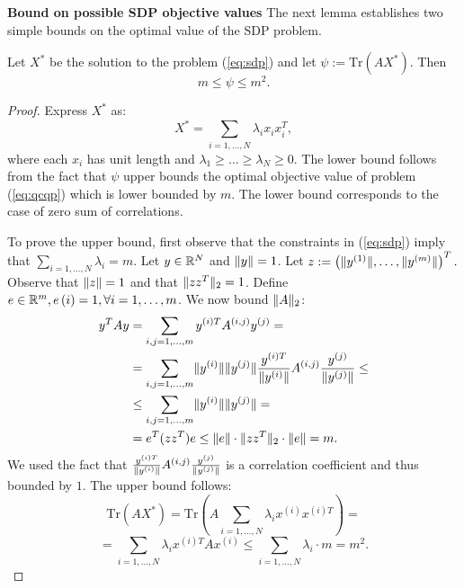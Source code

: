 \noindent\textbf{Bound on possible SDP objective values}
The next lemma establishes two simple bounds on the optimal value of the SDP problem.
\begin{lemma}\label{eq:lemsdp}
Let $X^*$ be the solution to the problem (\ref{eq:sdp}) and let $\psi := \mathrm{Tr}\left(A X^{*}\right)$. Then
$$m \leq \psi \leq m^2.$$
\end{lemma}
\begin{proof}
Express $X^*$ as:
$$X^* =  \underset{i=1,\ldots, N}{\sum} \lambda_i x_i x_i^T,$$
where each $x_i$ has unit length and $\lambda_1 \geq \ldots \geq \lambda_N \geq 0$.
The lower bound follows from the fact that $\psi$ upper bounds the optimal objective
value of problem (\ref{eq:qcqp}) which is lower bounded by $m$. The lower bound corresponds
to the case of zero sum of correlations.

To prove the upper bound, first observe that the constraints in (\ref{eq:sdp})
imply that $\underset{i=1,\ldots, N}{\sum}\lambda_i = m$.
Let $y \in \mathbb{R}^{N}$ and $\lVert y\rVert = 1$.
Let $z := \left(\lVert y^{(1)}\rVert, \ldots, \lVert y^{(m)}\rVert\right)^T.$
Observe that $\lVert z\rVert = 1$ and that $\lVert z z^T\rVert_2 = 1$.
Define $e \in \mathbb{R}^m, e\left(i\right) = 1,  \forall i=1,\ldots,m$.
We now bound $\lVert A\rVert_2$:
\begin{align*}
  y^T A y &= \sum_{i, j = 1,\ldots,m} y^{(i)T} A^{(i,j)} y^{(j)} = \\
& = \sum_{i, j = 1,\ldots,m} \lVert y^{(i)}\rVert \lVert y^{(j)}\rVert \frac{y^{(i)T}}{\lVert y^{(i)}\rVert} A^{(i,j)} \frac{y^{(j)}}{\lVert y^{(j)}\rVert} \leq \\
&\leq \sum_{i, j = 1,\ldots,m} \lVert y^{(i)}\rVert \lVert y^{(j)}\rVert = \\
&= e^T (z z^T) e \leq \lVert e\rVert\cdot \lVert z z^T\rVert_2 \cdot \lVert e\rVert = m.
\end{align*}
We used the fact that $\frac{y^{(i)T}}{\lVert y^{(i)}\rVert} A^{(i,j)} \frac{y^{(j)}}{\lVert y^{(j)}\rVert}$
is a correlation coefficient and thus bounded by $1$.
The upper bound follows:
$$\mathrm{Tr}\left(A X^{*}\right) = \mathrm{Tr}\left(A  \underset{i=1,\ldots, N}{\sum} \lambda_i x^{(i)} x^{(i)T}\right) =$$
$$=  \underset{i=1,\ldots, N}{\sum} \lambda_i x^{(i)T} A x^{(i)} \leq \underset{i=1,\ldots, N}{\sum} \lambda_i \cdot m = m^2.$$
\end{proof}

